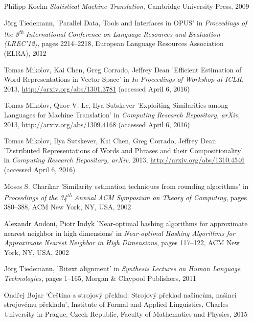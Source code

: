 \begin{thebibliography}{99}

Philipp Koehn
\textit{Statistical Machine Translation},
Cambridge University Press, 2009

Jörg Tiedemann,
'Parallel Data, Tools and Interfaces in OPUS'
in \textit{Proceedings of the 8\textsuperscript{th} International Conference on Language Resources and Evaluation (LREC'12)},
pages 2214--2218,
European Language Resources Association (ELRA), 2012 

Tomas Mikolov, Kai Chen, Greg Corrado, Jeffrey Dean
'Efficient Estimation of Word Representations in Vector Space'
in \textit{In Proceedings of Workshop at ICLR},
2013,
\url{http://arxiv.org/abs/1301.3781} (accessed April 6, 2016)

Tomas Mikolov, Quoc V. Le, Ilya Sutskever
'Exploiting Similarities among Languages for Machine Translation'
in \textit{Computing Research Repository, arXiv},
2013,
\url{http://arxiv.org/abs/1309.4168} (accessed April 6, 2016)

Tomas Mikolov, Ilya Sutskever, Kai Chen, Greg Corrado, Jeffrey Dean
'Distributed Representations of Words and Phrases and their Compositionality'
in \textit{Computing Research Repository, arXiv},
2013,
\url{http://arxiv.org/abs/1310.4546} (accessed April 6, 2016)

Moses S. Charikar
'Similarity estimation techniques from rounding algorithms'
in \textit{Proceedings of the 34\textsuperscript{th} Annual ACM Symposium on Theory of Computing},
pages 380--388,
ACM New York, NY, USA,
2002

Alexandr Andoni, Piotr Indyk
'Near-optimal hashing algorithms for approximate nearest neighbor in high dimensions'
in \textit{Near-optimal Hashing Algorithms for Approximate Nearest Neighbor in High Dimensions},
pages 117--122,
ACM New York, NY, USA,
2002

Jörg Tiedemann,
'Bitext alignment'
in \textit{Synthesis Lectures on Human Language Technologies},
pages 1--165,
Morgan \& Claypool Publishers, 2011

Ondřej Bojar
'Čeština a strojový překlad: Strojový překlad našincům, našinci strojovému překladu',
Institute of Formal and Applied Linguistics, 
Charles University in Prague, Czech Republic, 
Faculty of Mathematics and Physics,
2015


\end{thebibliography}
